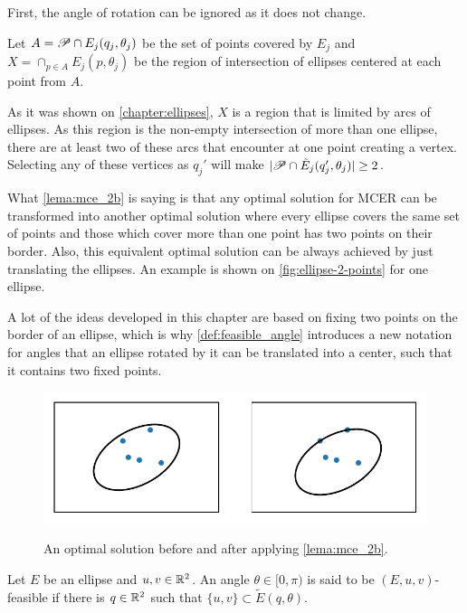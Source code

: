 \begin{demonstracao}
	First, the angle of rotation can be ignored as it does not change.
	
	Let $A=\mathscr{P} \cap E_j(q_j, \theta_j)$ be the set of points covered by $E_j$ and $X=\cap_{p \in A}E_j(p, \theta_j)$ be the region of intersection of ellipses centered at each point from $A$.

	As it was shown on \autoref{chapter:ellipses}, $X$ is a region that is limited by arcs of ellipses. As this region is the non-empty intersection of more than one ellipse, there are at least two of these arcs that encounter at one point creating a vertex. Selecting any of these vertices as $q_j'$ will make $|\mathscr{P} \cap \tilde{E}_j(q_j', \theta_j)| \ge 2$.
	
\end{demonstracao}

What \autoref{lema:mce_2b} is saying is that any optimal solution for MCER can be transformed into another optimal solution where every ellipse covers the same set of points and those which cover more than one point has two points on their border. Also, this equivalent optimal solution can be always achieved by just translating the ellipses. An example is shown on \autoref{fig:ellipse-2-points} for one ellipse.

A lot of the ideas developed in this chapter are based on fixing two points on the border of an ellipse, which is why \autoref{def:feasible_angle} introduces a new notation for angles that an ellipse rotated by it can be translated into a center, such that it contains two fixed points. 

\begin{figure}[H]
	\centering
	\caption{An optimal solution before and after applying \autoref{lema:mce_2b}.}
	\includegraphics{tex/figures/scripts/ellipse-2-points}
	\fautor
	\label{fig:ellipse-2-points}
\end{figure}



\begin{definicao}\label{def:feasible_angle}
	Let $E$ be an ellipse and $u, v \in \mathbb{R}^2$. An angle $\theta \in [0, \pi)$ is said to be $(E, u, v)$-feasible if there is $q \in \mathbb{R}^2$ such that $\{u, v\} \subset \tilde{E}(q, \theta)$.
\end{definicao}

